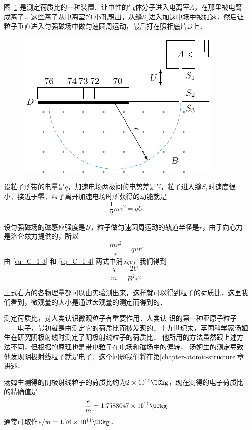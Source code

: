 图~\ref{fig_C_1-37} 是测定荷质比的一种装置．让中性的气体分子进入电离室$A$，在那里被电离成离子．这些离子从电离室的
小孔飘出，从缝$S_1$进入加速电场中被加速．然后让粒子垂直进入匀强磁场中做匀速圆周运动，最后打在照相底片$D$上．
\begin{figure}[htbp]
    \centering
    \includegraphics{fig/C/1-37.pdf}
    \caption{}\label{fig_C_1-37}
\end{figure}

设粒子所带的电量是$q$，加速电场两极间的电势差是$U$，粒子进入缝$S_1$时速度很小，接近于零，粒子离开加速电场时所获得的动能就是
\begin{equation}\label{eq_C_1-3}
\frac{1}{2}mv^2=qU    
\end{equation}

设匀强磁场的磁感应强度是$B$，粒子做匀速圆周运动的轨道半径是$r$，由于向心力是洛仑兹力提供的，所以
\begin{equation}\label{eq_C_1-4}
    \frac{mv^2}{r}=qvB
\end{equation}
由 \eqref{eq_C_1-3} 和 \eqref{eq_C_1-4} 两式中消去$v$，我们得到
\[\frac{q}{m}=\frac{2U}{B^2r^2}\]

上式右方的各物理量都可以由实验测出来，这样就可以得到粒子的荷质比．这里我们看到，微观量的大小是通过宏观量的测定而得到的．

测定荷质比，对人类认识微观粒子有重要作用．人类认
识的第一种亚原子粒子——电子，最初就是由测定它的荷质比而被发现的．十九世纪末，英国科学家汤姆生在研究阴极射线时测定了阴极射线粒子的荷质比．
他所用的方法虽然跟上述方法不同，但根据的原理也是带电粒子在电场和磁场中的偏转．
汤姆生的测定导致他发现阴极射线粒子就是电子，这个问题我们将在第\ref{chapter-atomic-structure}章讲述．

汤姆生测得的阴极射线粒子的荷质比约为$2\times10^{11}  \UCkg $，现在测得的电子荷质比的精确值是
\[\frac{e}{m}=1.7588047\times10^{11} \UCkg  \]
通常可取作$e/m=1.76\times10^{11} \UCkg $．

